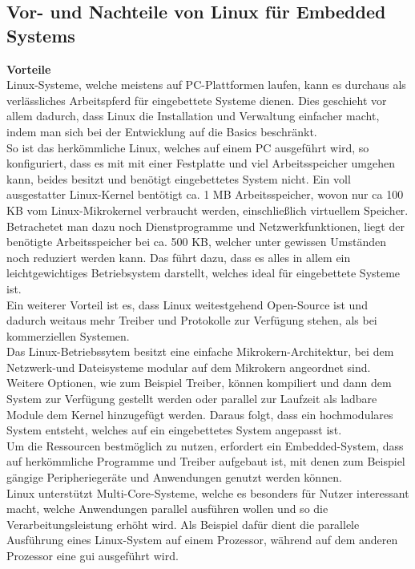 \subsection{Vor- und Nachteile von Linux für Embedded Systems}\label{kap:vorundnachteilelinux}

\textbf{Vorteile}\\

Linux-Systeme, welche meistens auf PC-Plattformen laufen, kann es durchaus als verlässliches Arbeitspferd für eingebettete Systeme dienen. Dies geschieht vor allem dadurch, dass Linux die Installation und Verwaltung einfacher macht, indem man sich bei der Entwicklung
auf die Basics beschränkt.\\
So ist das herkömmliche Linux, welches auf einem PC ausgeführt wird, so konfiguriert, dass es mit mit einer Festplatte und viel Arbeitsspeicher umgehen kann, beides besitzt und benötigt eingebettetes System nicht.
 Ein voll ausgestatter Linux-Kernel bentötigt ca. 1 MB Arbeitsspeicher, wovon nur ca 100 KB vom Linux-Mikrokernel verbraucht werden, einschließlich virtuellem Speicher. Betrachetet man dazu noch Dienstprogramme und Netzwerkfunktionen, liegt der benötigte
 Arbeitsspeicher bei ca. 500 KB, welcher unter gewissen Umständen noch reduziert werden kann. Das führt dazu, dass es alles in allem ein leichtgewichtiges Betriebsystem darstellt, welches ideal für eingebettete Systeme ist.\\
 Ein weiterer Vorteil ist es, dass Linux weitestgehend Open-Source ist und dadurch weitaus mehr Treiber und Protokolle zur Verfügung stehen, als bei kommerziellen Systemen. \\
 Das Linux-Betriebssytem besitzt eine einfache Mikrokern-Architektur, bei dem Netzwerk-und Dateisysteme modular auf dem Mikrokern angeordnet sind. Weitere Optionen, wie zum Beispiel Treiber, können kompiliert und dann dem System zur Verfügung gestellt werden
 oder parallel zur Laufzeit als ladbare Module dem Kernel hinzugefügt werden. Daraus folgt, dass ein hochmodulares System entsteht, welches auf ein eingebettetes System angepasst ist.\\
 Um die Ressourcen bestmöglich zu nutzen, erfordert ein Embedded-System, dass auf herkömmliche Programme und Treiber aufgebaut ist, mit denen zum Beispiel gängige Peripheriegeräte und Anwendungen genutzt werden können.\\
 Linux unterstützt Multi-Core-Systeme, welche es besonders für Nutzer interessant macht, welche Anwendungen parallel ausführen wollen und so die Verarbeitungsleistung erhöht wird. Als Beispiel dafür dient die parallele Ausführung eines Linux-System auf einem Prozessor,
  während auf dem anderen Prozessor eine \ac{gui} ausgeführt wird.\\


